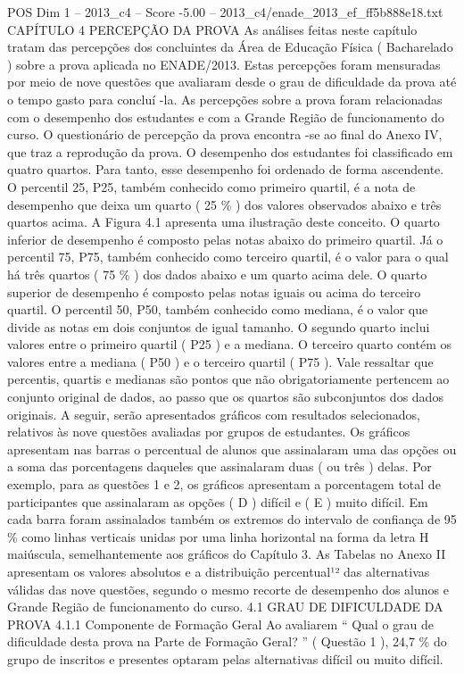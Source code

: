 \begin{textsample}{POS Dim 1 – 2013\_c4 – Score -5.00 – 2013\_c4/enade\_2013\_ef\_ff5b888e18.txt}  \label{ex:f1_pos_384}
CAPÍTULO 4 PERCEPÇÃO DA PROVA As análises feitas neste capítulo tratam das percepções dos concluintes da Área de Educação Física ( Bacharelado ) sobre a prova aplicada no ENADE/2013.
Estas percepções foram mensuradas por meio de nove questões que avaliaram desde o grau de dificuldade da prova até o tempo gasto para concluí -la.
As percepções sobre a prova foram relacionadas com o desempenho dos estudantes e com a Grande Região de funcionamento do curso.
O questionário de percepção da prova encontra -se ao final do Anexo IV, que traz a reprodução da prova.
O desempenho dos estudantes foi classificado em quatro quartos.
Para tanto, esse desempenho foi ordenado de forma ascendente.
O percentil 25, P25, também conhecido como primeiro quartil, é a nota de desempenho que deixa um quarto ( 25 \% ) dos valores observados abaixo e três quartos acima.
A Figura 4.1 apresenta uma ilustração deste conceito.
O quarto inferior de desempenho é composto pelas notas abaixo do primeiro quartil.
Já o percentil 75, P75, também conhecido como terceiro quartil, é o valor para o qual há três quartos ( 75 \% ) dos dados abaixo e um quarto acima dele.
O quarto superior de desempenho é composto pelas notas iguais ou acima do terceiro quartil.
O percentil 50, P50, também conhecido como mediana, é o valor que divide as notas em dois conjuntos de igual tamanho.
O segundo quarto inclui valores entre o primeiro quartil ( P25 ) e a mediana.
O terceiro quarto contém os valores entre a mediana ( P50 ) e o terceiro quartil ( P75 ).
Vale ressaltar que percentis, quartis e medianas são pontos que não obrigatoriamente pertencem ao conjunto original de dados, ao passo que os quartos são subconjuntos dos dados originais.
A seguir, serão apresentados gráficos com resultados selecionados, relativos às nove questões avaliadas por grupos de estudantes.
Os gráficos apresentam nas barras o percentual de alunos que assinalaram uma das opções ou a soma das porcentagens daqueles que assinalaram duas ( ou três ) delas.
Por exemplo, para as questões 1 e 2, os gráficos apresentam a porcentagem total de participantes que assinalaram as opções ( D ) difícil e ( E ) muito difícil.
Em cada barra foram assinalados também os extremos do intervalo de confiança de 95 \% como linhas verticais unidas por uma linha horizontal na forma da letra H maiúscula, semelhantemente aos gráficos do Capítulo 3.
As Tabelas no Anexo II apresentam os valores absolutos e a distribuição percentual¹² das alternativas válidas das nove questões, segundo o mesmo recorte de desempenho dos alunos e Grande Região de funcionamento do curso. 4.1 GRAU DE DIFICULDADE DA PROVA 4.1.1 Componente de Formação Geral Ao avaliarem “ Qual o grau de dificuldade desta prova na Parte de Formação Geral? ” ( Questão 1 ), 24,7 \% do grupo de inscritos e presentes optaram pelas alternativas difícil ou muito difícil.

\end{textsample}
